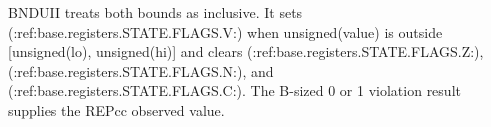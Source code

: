 BNDUII treats both bounds as inclusive. It sets (:ref:base.registers.STATE.FLAGS.V:) when unsigned(value) is outside [unsigned(lo), unsigned(hi)] and clears (:ref:base.registers.STATE.FLAGS.Z:), (:ref:base.registers.STATE.FLAGS.N:), and (:ref:base.registers.STATE.FLAGS.C:). The B-sized 0 or 1 violation result supplies the REPcc observed value.
